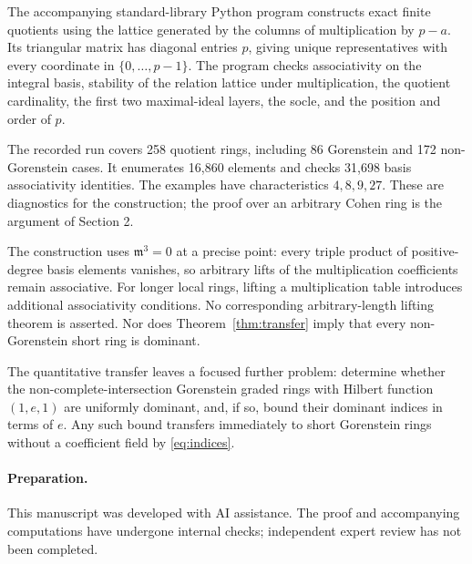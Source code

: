 \documentclass[11pt]{article}
\theoremstyle{remark}\newtheorem{remark}[theorem]{Remark}
\newcommand{\m}{\mathfrak m}
\begin{document}
The accompanying standard-library Python program constructs exact finite quotients using the lattice generated by the columns of multiplication by $p-a$. Its triangular matrix has diagonal entries $p$, giving unique representatives with every coordinate in $\{0,\ldots,p-1\}$. The program checks associativity on the integral basis, stability of the relation lattice under multiplication, the quotient cardinality, the first two maximal-ideal layers, the socle, and the position and order of $p$.

The recorded run covers 258 quotient rings, including 86 Gorenstein and 172 non-Gorenstein cases. It enumerates 16,860 elements and checks 31,698 basis associativity identities. The examples have characteristics $4,8,9,27$. These are diagnostics for the construction; the proof over an arbitrary Cohen ring is the argument of Section 2.

The construction uses $\m^3=0$ at a precise point: every triple product of positive-degree basis elements vanishes, so arbitrary lifts of the multiplication coefficients remain associative. For longer local rings, lifting a multiplication table introduces additional associativity conditions. No corresponding arbitrary-length lifting theorem is asserted. Nor does Theorem~\ref{thm:transfer} imply that every non-Gorenstein short ring is dominant.

The quantitative transfer leaves a focused further problem: determine whether the non-complete-intersection Gorenstein graded rings with Hilbert function $(1,e,1)$ are uniformly dominant, and, if so, bound their dominant indices in terms of $e$. Any such bound transfers immediately to short Gorenstein rings without a coefficient field by \eqref{eq:indices}.

\paragraph{Preparation.} This manuscript was developed with AI assistance. The proof and accompanying computations have undergone internal checks; independent expert review has not been completed.
\end{document}

